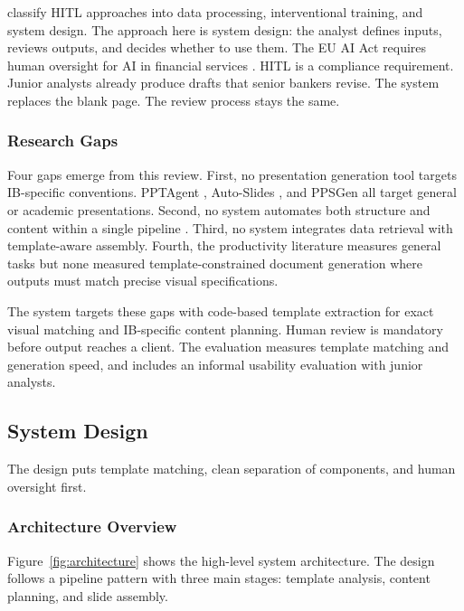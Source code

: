 \textcite{wu2022} classify HITL approaches into data processing, interventional training, and system design. The approach here is system design: the analyst defines inputs, reviews outputs, and decides whether to use them. The EU AI Act requires human oversight for AI in financial services \parencite{bis2024}. HITL is a compliance requirement. Junior analysts already produce drafts that senior bankers revise. The system replaces the blank page. The review process stays the same.

\subsubsection{Research Gaps}

Four gaps emerge from this review. First, no presentation generation tool targets IB-specific conventions. PPTAgent \parencite{zheng2025}, Auto-Slides \parencite{yang2025}, and PPSGen \parencite{hu2013} all target general or academic presentations. Second, no system automates both structure and content within a single pipeline \parencite{achachlouei2023}. Third, no system integrates data retrieval with template-aware assembly. Fourth, the productivity literature measures general tasks but none measured template-constrained document generation where outputs must match precise visual specifications.

The system targets these gaps with code-based template extraction for exact visual matching and IB-specific content planning. Human review is mandatory before output reaches a client. The evaluation measures template matching and generation speed, and includes an informal usability evaluation with junior analysts.

\subsection{System Design}

The design puts template matching, clean separation of components, and human oversight first.

\subsubsection{Architecture Overview}

Figure~\ref{fig:architecture} shows the high-level system architecture. The design follows a pipeline pattern with three main stages: template analysis, content planning, and slide assembly.


